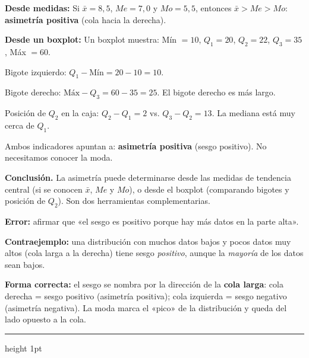 \documentclass[11pt, letterpaper]{article}
\newcommand{\subbloque}[1]{%
  \vspace{14pt}
  \noindent{\large\bfseries\color{zenitnavy} #1}\par
  \vspace{4pt}\hrule height 1pt\vspace{8pt}}
\begin{document}
\begin{tcolorbox}[examplebox, title={Ej. 14. Identificar asimetría desde distintas fuentes}]
\noindent\textbf{Desde medidas:} Si $\bar{x} = 8{,}5$, $Me = 7{,}0$ y $Mo = 5{,}5$, entonces $\bar{x} > Me > Mo$: \textbf{asimetría positiva} (cola hacia la derecha).
\medskip

\noindent\textbf{Desde un boxplot:} Un boxplot muestra: Mín $= 10$, $Q_1 = 20$, $Q_2 = 22$, $Q_3 = 35$, Máx $= 60$.

  Bigote izquierdo: $Q_1 - \text{Mín} = 20 - 10 = 10$.

  Bigote derecho: $\text{Máx} - Q_3 = 60 - 35 = 25$. El bigote derecho es más largo.

  Posición de $Q_2$ en la caja: $Q_2 - Q_1 = 2$ vs. $Q_3 - Q_2 = 13$. La mediana está muy cerca de $Q_1$.

  Ambos indicadores apuntan a: \textbf{asimetría positiva} (sesgo positivo). No necesitamos conocer la moda.
\medskip

\noindent\textbf{Conclusión.} La asimetría puede determinarse desde las medidas de tendencia central (si se conocen $\bar{x}$, $Me$ y $Mo$), o desde el boxplot (comparando bigotes y posición de $Q_2$). Son dos herramientas complementarias.

\end{tcolorbox}

\begin{tcolorbox}[warningbox, title={Error frecuente: confundir la dirección del sesgo con la concentración de datos}]
\textbf{Error:} afirmar que «el sesgo es positivo porque hay más datos en la parte alta».

\medskip

\textbf{Contraejemplo:} una distribución con muchos datos bajos y pocos datos muy altos (cola larga a la derecha) tiene sesgo \textit{positivo}, aunque la \textit{mayoría} de los datos sean bajos.

\medskip

\textbf{Forma correcta:} el sesgo se nombra por la dirección de la \textbf{cola larga}: cola derecha = sesgo positivo (asimetría positiva); cola izquierda = sesgo negativo (asimetría negativa). La moda marca el «pico» de la distribución y queda del lado opuesto a la cola.
\end{tcolorbox}

\subbloque{Práctica inmediata 7.1}
\end{document}
